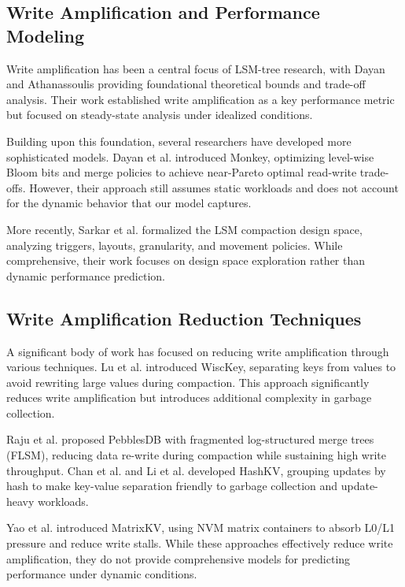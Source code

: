 \documentclass[11pt]{article}
\begin{document}
\subsection{Write Amplification and Performance Modeling}

Write amplification has been a central focus of LSM-tree research, with Dayan and Athanassoulis \cite{dayan2017lsm} providing foundational theoretical bounds and trade-off analysis. Their work established write amplification as a key performance metric but focused on steady-state analysis under idealized conditions.

Building upon this foundation, several researchers have developed more sophisticated models. Dayan et al. \cite{dayan2017monkey} introduced Monkey, optimizing level-wise Bloom bits and merge policies to achieve near-Pareto optimal read-write trade-offs. However, their approach still assumes static workloads and does not account for the dynamic behavior that our model captures.

More recently, Sarkar et al. \cite{sarkar2021lsmcompaction} formalized the LSM compaction design space, analyzing triggers, layouts, granularity, and movement policies. While comprehensive, their work focuses on design space exploration rather than dynamic performance prediction.

\subsection{Write Amplification Reduction Techniques}

A significant body of work has focused on reducing write amplification through various techniques. Lu et al. \cite{lu2016wisckey} introduced WiscKey, separating keys from values to avoid rewriting large values during compaction. This approach significantly reduces write amplification but introduces additional complexity in garbage collection.

Raju et al. \cite{raju2017pebblesdb} proposed PebblesDB with fragmented log-structured merge trees (FLSM), reducing data re-write during compaction while sustaining high write throughput. Chan et al. \cite{chan2018hashkv} and Li et al. \cite{li2019hashkv_tos} developed HashKV, grouping updates by hash to make key-value separation friendly to garbage collection and update-heavy workloads.

Yao et al. \cite{yao2020matrixkv} introduced MatrixKV, using NVM matrix containers to absorb L0/L1 pressure and reduce write stalls. While these approaches effectively reduce write amplification, they do not provide comprehensive models for predicting performance under dynamic conditions.
\end{document}
